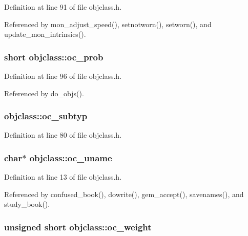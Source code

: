 Definition at line 91 of file objclass.\+h.



Referenced by mon\+\_\+adjust\+\_\+speed(), setnotworn(), setworn(), and update\+\_\+mon\+\_\+intrinsics().

\hypertarget{structobjclass_a925611795481028809437d812eef055d}{
\subsubsection[{oc\+\_\+prob}]{\setlength{\rightskip}{0pt plus 5cm}short objclass\+::oc\+\_\+prob}}\label{structobjclass_a925611795481028809437d812eef055d}


Definition at line 96 of file objclass.\+h.



Referenced by do\+\_\+objs().

\hypertarget{structobjclass_aceb03436eb0a4aa94613ece9fed7b141}{
\subsubsection[{oc\+\_\+subtyp}]{ objclass\+::oc\+\_\+subtyp}}\label{structobjclass_aceb03436eb0a4aa94613ece9fed7b141}


Definition at line 80 of file objclass.\+h.

\hypertarget{structobjclass_a2556428315c0776ce8f5c88ecf6508bc}{
\subsubsection[{oc\+\_\+uname}]{\setlength{\rightskip}{0pt plus 5cm}char$\ast$ objclass\+::oc\+\_\+uname}}\label{structobjclass_a2556428315c0776ce8f5c88ecf6508bc}


Definition at line 13 of file objclass.\+h.



Referenced by confused\+\_\+book(), dowrite(), gem\+\_\+accept(), savenames(), and study\+\_\+book().

\hypertarget{structobjclass_a622ad2b24eb1e4b8386a4c8d04a8a5bc}{
\subsubsection[{oc\+\_\+weight}]{\setlength{\rightskip}{0pt plus 5cm}unsigned short objclass\+::oc\+\_\+weight}}\label{structobjclass_a622ad2b24eb1e4b8386a4c8d04a8a5bc}


